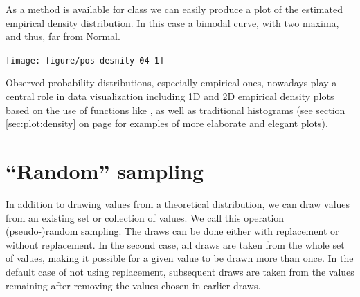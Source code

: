 \documentclass[krantz2]{krantz}\usepackage{knitr}
\begin{document}
As a  method is available for class  we can easily produce a plot of the estimated empirical density distribution. In this case a bimodal curve, with two maxima, and thus, far from Normal.

\begin{knitrout}\footnotesize
{}\color{fgcolor}\begin{kframe}
\begin{alltt}
\end{alltt}
\end{kframe}

{\centering \texttt{[image: figure/pos-desnity-04-1]} 

}


\end{knitrout}

Observed probability distributions, especially empirical ones, nowadays play a central role in data visualization including 1D and 2D empirical density plots based on the use of functions like , as well as traditional histograms (see section \ref{sec:plot:density} on page \pageref{sec:plot:density} for examples of more elaborate and elegant plots).

\section{``Random'' sampling}
%
%

In addition to drawing values from a theoretical distribution, we can draw values from an existing set or collection of values. We call this operation (pseudo-)random sampling. The draws can be done either with replacement or without replacement. In the second case, all draws are taken from the whole set of values, making it possible for a given value to be drawn more than once. In the default case of not using replacement, subsequent draws are taken from the values remaining after removing the values chosen in earlier draws.
\end{document}
